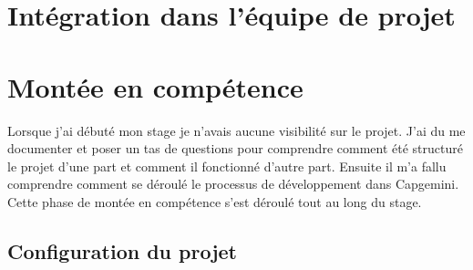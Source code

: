 \chapter{Intégration dans l'équipe de projet}
\label{travauxreal}
\chapter{Montée en compétence}
Lorsque j'ai débuté mon stage je n'avais aucune visibilité sur le projet.
J'ai du me documenter et poser un tas de questions pour comprendre comment été structuré le projet d'une part et comment il fonctionné d'autre part. Ensuite il m'a fallu comprendre comment se déroulé le processus de développement dans Capgemini.
Cette phase de montée en compétence s'est déroulé tout au long du stage.

\section{Configuration du projet}
